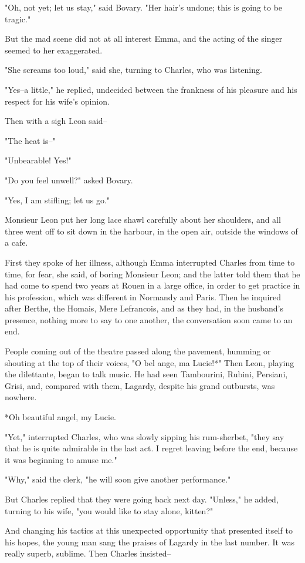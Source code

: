 \documentclass[11pt,twocolumn]{ltugboat}
\begin{document}
"Oh, not yet; let us stay," said Bovary. "Her hair's undone; this is
going to be tragic."

But the mad scene did not at all interest Emma, and the acting of the
singer seemed to her exaggerated.

"She screams too loud," said she, turning to Charles, who was listening.

"Yes--a little," he replied, undecided between the frankness of his
pleasure and his respect for his wife's opinion.

Then with a sigh Leon said--

"The heat is--"

"Unbearable! Yes!"

"Do you feel unwell?" asked Bovary.

"Yes, I am stifling; let us go."

Monsieur Leon put her long lace shawl carefully about her shoulders, and
all three went off to sit down in the harbour, in the open air, outside
the windows of a cafe.

First they spoke of her illness, although Emma interrupted Charles
from time to time, for fear, she said, of boring Monsieur Leon; and the
latter told them that he had come to spend two years at Rouen in a large
office, in order to get practice in his profession, which was different
in Normandy and Paris. Then he inquired after Berthe, the Homais, Mere
Lefrancois, and as they had, in the husband's presence, nothing more to
say to one another, the conversation soon came to an end.

People coming out of the theatre passed along the pavement, humming or
shouting at the top of their voices, "O bel ange, ma Lucie!*" Then Leon,
playing the dilettante, began to talk music. He had seen Tambourini,
Rubini, Persiani, Grisi, and, compared with them, Lagardy, despite his
grand outbursts, was nowhere.

     *Oh beautiful angel, my Lucie.


"Yet," interrupted Charles, who was slowly sipping his rum-sherbet,
"they say that he is quite admirable in the last act. I regret leaving
before the end, because it was beginning to amuse me."

"Why," said the clerk, "he will soon give another performance."

But Charles replied that they were going back next day. "Unless," he
added, turning to his wife, "you would like to stay alone, kitten?"

And changing his tactics at this unexpected opportunity that presented
itself to his hopes, the young man sang the praises of Lagardy in the
last number. It was really superb, sublime. Then Charles insisted--
\end{document}
